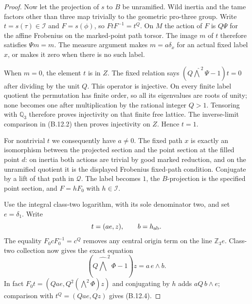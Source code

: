 \begin{proof}
Now let the projection of $s$ to $B$ be unramified.
Wild inertia and the tame factors other than three
map trivially to the geometric pro-three group.
Write $t=s(\tau)\in\mathscr I$ and $F=s(\phi)$,
so $FtF^{-1}=t^Q$.
On $M$ the action of $F$ is $Q\Psi$ for the affine
Frobenius on the marked-point path torsor. The image
$m$ of $t$ therefore satisfies $\Psi m=m$.
The measure argument makes $m=a\delta_x$ for an actual
fixed label $x$, or makes it zero when there is no such
label.

When $m=0$, the element $t$ is in $Z$.
The fixed relation says
$(Q\widehat{\bigwedge}^{\,2}\Psi-1)t=0$ after dividing
by the unit $Q$. This operator is injective.
On every finite label quotient the permutation has
finite order, so all its eigenvalues are roots of
unity; none becomes one after multiplication by
the rational integer $Q>1$. Tensoring with $\mathbb Q_3$
therefore proves injectivity on that finite free lattice.
The inverse-limit comparison in (B.12.2) then proves
injectivity on $Z$. Hence $t=1$.

For nontrivial $t$ we consequently have $a\ne0$.
The fixed path $x$ is exactly an isomorphism between
the projected section and the point section at the
filled point $d$: on inertia both actions are trivial
by good marked reduction, and on the unramified
quotient it is the displayed Frobenius fixed-path
condition. Conjugate by a lift of that path in
$\mathscr Q$. The label becomes $1$, the $B$-projection
is the specified point section, and $F=hF_0$ with
$h\in\mathscr I$.

Use the integral class-two logarithm, with its sole
denominator two, and set $e=\delta_1$.
Write
\[
                   t=(ae,z),\qquad b=h_{\rm ab}.
 \]
The equality $F_0cF_0^{-1}=c^Q$ removes any central
origin term on the line $\mathbb Z_3e$.
Class-two collection now gives the exact equation
\[
       (Q\widehat{\bigwedge}^{\,2}\Phi-1)z
                           =a\,e\wedge b.                  \tag{B.12.4}
\]
In fact $F_0t=(Qae,Q^2(\bigwedge^2\Phi)z)$ and
conjugating by $h$ adds $aQ\,b\wedge e$; comparison
with $t^Q=(Qae,Qz)$ gives (B.12.4).


\end{proof}
